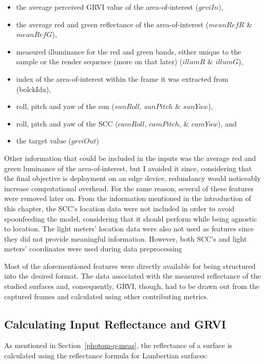 \begin{itemize}
    \item the average perceived GRVI value of the area-of-interest ($grviIn$),
    \item the average red and green reflectance of the area-of-interest ($meanRefR$ \& $meanRefG$),
    \item measured illuminance for the red and green bands, either unique to the sample or the render sequence (more on that later) ($illumR$ \& $illumG$),
    \item index of the area-of-interest within the frame it was extracted from (bolckIdx),
    \item roll, pitch and yaw of the sun ($sunRoll$, $sunPitch$ \& $sunYaw$),
    \item roll, pitch and yaw of the SCC ($camRoll$, $camPitch$, \& $camYaw$), and
    \item the target value ($grviOut$)
\end{itemize}

Other information that could be included in the inputs was the average red and green luminance of the area-of-interest, but I avoided it since, considering that the final objective is deployment on an edge device, redundancy would noticeably increase computational overhead. For the same reason, several of these features were removed later on. From the information mentioned in the introduction of this chapter, the SCC's location data were not included in order to avoid spoonfeeding the model, considering that it should perform while being agnostic to location. The light meters' location data were also not used as features since they did not provide meaningful information. However, both SCC's and light meters' coordinates were used during data preprocessing

Most of the aforementioned features were directly available for being structured into the desired format. The data associated with the measured reflectance of the studied surfaces and, consequently, GRVI, though, had to be drawn out from the captured frames and calculated using other contributing metrics.

\subsection{Calculating Input Reflectance and GRVI}

As mentioned in Section~\ref{photom-q-meas}, the reflectance of a surface is calculated using the reflectance formula for Lambertian surfaces:

